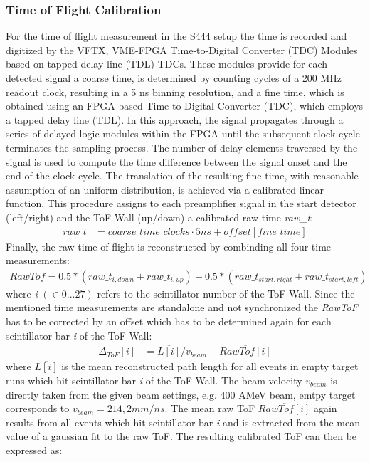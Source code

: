 \subsubsection{Time of Flight Calibration}
For the time of flight measurement in the S444 setup the time is recorded and digitized by the VFTX,  VME-FPGA Time-to-Digital Converter (TDC) Modules based on tapped delay line (TDL) TDCs\cite{bayer2009development}. These modules provide for each detected signal a coarse time, is determined by counting cycles of a 200 MHz readout clock, resulting in a 5 ns binning resolution, and a fine time, which is obtained using an FPGA-based Time-to-Digital Converter (TDC), which employs a tapped delay line (TDL). In this approach, the signal propagates through a series of delayed logic modules within the FPGA until the subsequent clock cycle terminates the sampling process. The number of delay elements traversed by the signal is used to compute the time difference between the signal onset and the end of the clock cycle. The translation of the resulting fine time, with reasonable assumption of an uniform distribution, is achieved via a calibrated linear function. This procedure assigns to each preamplifier signal in the start detector (left/right) and the ToF Wall (up/down) a calibrated raw time \textit{raw\_t}:
\begin{align*}
raw\_t &= coarse\_time\_clocks  \cdot 5ns + offset[fine\_time]
\end{align*}
Finally, the raw time of flight is reconstructed by combinding all four time measurements:
\begin{gather}
RawTof = 0.5*(raw\_t_{i,down}+raw\_t_{i,up}) - 0.5*(raw\_t_{start,right}+raw\_t_{start,left})
\end{gather}
where \textit{i} $(\in 0...27)$ refers to the scintillator number of the ToF Wall. Since the mentioned time measurements are standalone and not synchronized the \textit{RawToF} has to be corrected by an offset which has to be determined again for each scintillator bar \textit{i} of the ToF Wall:
\begin{align*}
\Delta_{ToF}[i] &= \overline{L[i]}/v_{beam} - \overline{RawTof[i]}
\end{align*} 
where $\overline{L[i]}$ is the mean reconstructed path length for all events in empty target runs which hit scintillator bar \textit{i} of the ToF Wall. The beam velocity $v_{beam}$ is directly taken from the given beam settings, e.g. 400 AMeV beam, emtpy target corresponds to $v_{beam} = 214,2mm/ns$. The mean raw ToF $\overline{RawTof[i]}$ again results from all events which hit scintillator bar \textit{i} and is extracted from the mean value of a gaussian fit to the raw ToF. The resulting calibrated ToF can then be expressed as:
